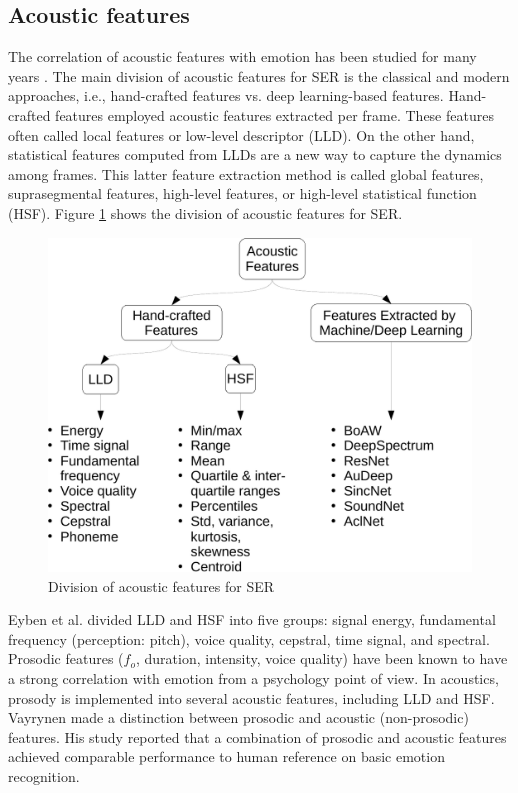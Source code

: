 \subsection{Acoustic features}
The correlation of acoustic features with emotion has been studied for many
years \cite{Scherer2005, Mairano}. The main division of acoustic features for
SER is the classical and modern approaches, i.e., hand-crafted features vs.
deep learning-based features. Hand-crafted features employed acoustic features
extracted per frame. These features often called local features or low-level
descriptor (LLD). On the other hand, statistical features computed from LLDs
are a new way to capture the dynamics among frames. This latter feature
extraction method is called global features, suprasegmental features,
high-level features, or high-level statistical function (HSF). Figure
\ref{fig:aco_feat} shows the division of acoustic features for SER.

\begin{figure}[htbp]
    \centering
    \includegraphics[width=.7\textwidth]{../fig/acoustic_features-crop.pdf}
    \caption{Division of acoustic features for SER}
    \label{fig:aco_feat}
\end{figure}

Eyben et al. \cite{Eyben2010} divided LLD and HSF into five groups: signal
energy, fundamental frequency (perception: pitch), voice quality, cepstral,
time signal, and spectral. Prosodic features ($f_o$, duration, intensity, voice
quality) have been known to have a strong correlation with emotion
\cite{Frick1985,Mozziconacci2002,Fritz2016} from a psychology point of view. In
acoustics, prosody is implemented into several acoustic features, including LLD
and HSF. Vayrynen \cite{Vayrynen2014} made a distinction between prosodic and
acoustic (non-prosodic) features. His study reported that a combination of
prosodic and acoustic features achieved comparable performance to human
reference on basic emotion recognition.

